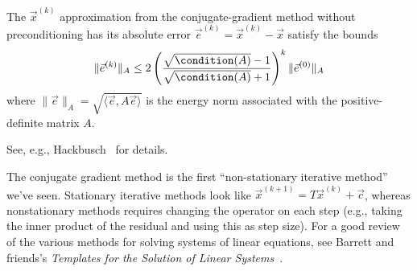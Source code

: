 \begin{theorem}
The $\vec{x}^{(k)}$ approximation from the conjugate-gradient method
without preconditioning has its absolute error
$\vec{e}^{(k)}=\vec{x}^{(k)}-\vec{x}$ satisfy the bounds
\begin{equation}
\|\vec{e}^{(k)}\|_{A}\leq2\left(\frac{\sqrt{\condition(A)}-1}{\sqrt{\condition(A)}+1}\right)^{k}\|\vec{e}^{(0)}\|_{A}
\end{equation}
where $\|\vec{e}\|_{A}=\sqrt{\langle\vec{e},A\vec{e}\rangle}$ is the
energy norm associated with the positive-definite matrix $A$.
\end{theorem}

See, e.g., Hackbusch~\cite[\S10.2.3]{hackbusch2016iterative} for
details.

\begin{rmk}
The conjugate gradient method is the first ``non-stationary iterative method''
we've seen. Stationary iterative methods look like
$\vec{x}^{(k+1)}=T\vec{x}^{(k)}+\vec{c}$, whereas nonstationary methods
requires changing the operator on each step (e.g., taking the inner
product of the residual and using this as step size). For a good review
of the various methods for solving systems of linear equations, see
Barrett and friends's \textit{Templates for the Solution of Linear Systems}~\cite{barrett1994templates}.
\end{rmk}

